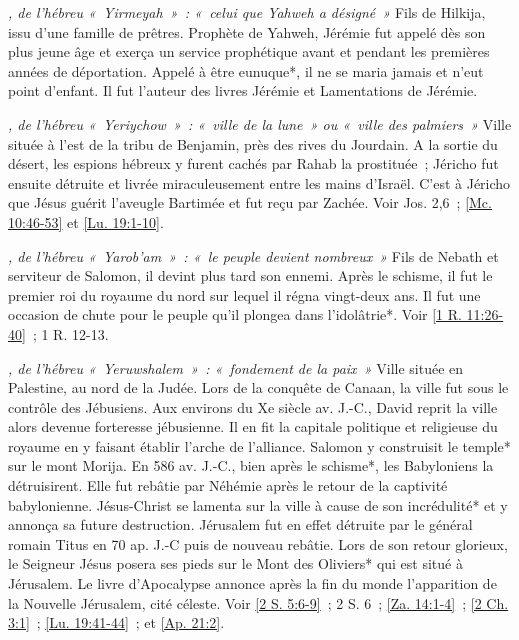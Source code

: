 \begin{multicols}{2}
\textit{, de l'hébreu «~Yirmeyah~»~: «~celui que Yahweh a désigné~»}\newline
Fils de Hilkija, issu d'une famille de prêtres. Prophète de Yahweh, Jérémie fut appelé dès son plus jeune âge et exerça un service prophétique avant et pendant les premières années de déportation. Appelé à être eunuque*, il ne se maria jamais et n'eut point d'enfant. Il fut l'auteur des livres Jérémie et Lamentations de Jérémie.

\textit{, de l'hébreu «~Yeriychow~»~: «~ville de la lune~» ou «~ville des palmiers~»}\newline
Ville située à l'est de la tribu de Benjamin, près des rives du Jourdain. A la sortie du désert, les espions hébreux y furent cachés par Rahab la prostituée~; Jéricho fut ensuite détruite et livrée miraculeusement entre les mains d'Israël. C'est à Jéricho que Jésus guérit l'aveugle Bartimée et fut reçu par Zachée. Voir Jos. 2,6~; \vref{Mc. 10:46-53} et \vref{Lu. 19:1-10}.

\textit{, de l'hébreu «~Yarob'am~»~: «~le peuple devient nombreux~»}\newline
Fils de Nebath et serviteur de Salomon, il devint plus tard son ennemi. Après le schisme, il fut le premier roi du royaume du nord sur lequel il régna vingt-deux ans. Il fut une occasion de chute pour le peuple qu'il plongea dans l'idolâtrie*. Voir \vref{1 R. 11:26-40}~; 1 R. 12-13.

\textit{, de l'hébreu «~Yeruwshalem~»~: «~fondement de la paix~»}\newline
Ville située en Palestine, au nord de la Judée. Lors de la conquête de Canaan, la ville fut sous le contrôle des Jébusiens. Aux environs du Xe siècle av. J.-C., David reprit la ville alors devenue forteresse jébusienne. Il en fit la capitale politique et religieuse du royaume en y faisant établir l'arche de l'alliance. Salomon y construisit le temple* sur le mont Morija. En 586 av. J.-C., bien après le schisme*, les Babyloniens la détruisirent. Elle fut rebâtie par Néhémie après le retour de la captivité babylonienne. Jésus-Christ se lamenta sur la ville à cause de son incrédulité* et y annonça sa future destruction. Jérusalem fut en effet détruite par le général romain Titus en 70 ap. J.-C puis de nouveau rebâtie. Lors de son retour glorieux, le Seigneur Jésus posera ses pieds sur le Mont des Oliviers* qui est situé à Jérusalem. Le livre d'Apocalypse annonce après la fin du monde l'apparition de la Nouvelle Jérusalem, cité céleste. Voir \vref{2 S. 5:6-9}~; 2 S. 6~; \vref{Za. 14:1-4}~; \vref{2 Ch. 3:1}~; \vref{Lu. 19:41-44}~; et \vref{Ap. 21:2}.


\end{multicols}
